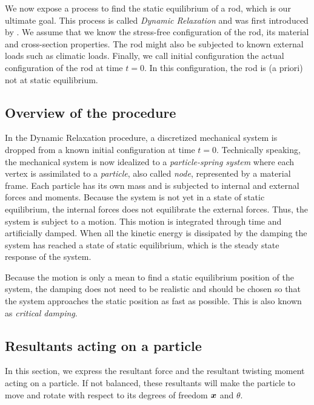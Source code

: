 We now expose a process to find the static equilibrium of a rod, which is our ultimate goal. This process is called \emph{Dynamic Relaxation} and was first introduced by . We assume that we know the stress-free configuration of the rod, its material and cross-section properties. The rod might also be subjected to known external loads such as climatic loads. Finally, we call initial configuration the actual configuration of the rod at time $t=0$. In this configuration, the rod is (a priori) not at static equilibrium.

\subsection{Overview of the procedure}
In the Dynamic Relaxation procedure, a discretized mechanical system is dropped from a known initial configuration at time $t=0$. Technically speaking, the mechanical system is now idealized to a \emph{particle-spring system} where each vertex is assimilated to a \emph{particle}, also called \emph{node}, represented by a material frame. Each particle has its own mass and is subjected to internal and external forces and moments. Because the system is not yet in a state of static equilibrium, the internal forces does not equilibrate the external forces. Thus, the system is subject to a motion. This motion is integrated through time and artificially damped. When all the kinetic energy is dissipated by the damping the system has reached a state of static equilibrium, which is the steady state response of the system.

Because the motion is only a mean to find a static equilibrium position of the system, the damping does not need to be realistic and should be chosen so that the system approaches the static position as fast as possible. This is also known as \emph{critical damping}.

\subsection{Resultants acting on a particle}\label{sec=resFM}
In this section, we express the resultant force and the resultant twisting moment acting on a particle. If not balanced, these resultants will make the particle to move and rotate with respect to its degrees of freedom $\boldsymbol{x}$ and $\theta$.


